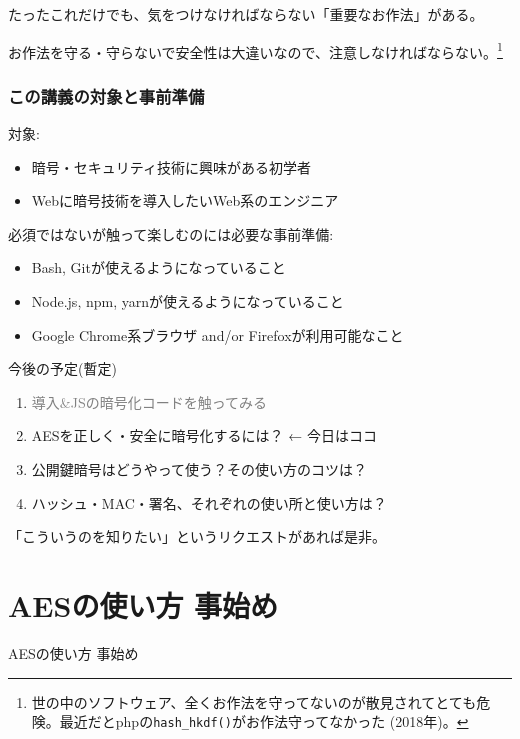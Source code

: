 \documentclass[12pt,dvipdfmx]{beamer}
\begin{document}
\begin{frame}

たったこれだけでも、気をつけなければならない\alert{「重要なお作法」}がある。

\vspace{2ex}

\alert{お作法を守る・守らないで安全性は大違い}なので、注意しなければならない。\footnote[frame]{世の中のソフトウェア、全くお作法を守ってないのが散見されてとても危険。最近だとphpの\texttt{hash\_hkdf()}がお作法守ってなかった (2018年)。}
\end{frame}

\begin{frame}
\frametitle{この講義の対象と事前準備}
対象:
\begin{itemize}
\item 暗号・セキュリティ技術に興味がある初学者
\item Webに暗号技術を導入したいWeb系のエンジニア
\end{itemize}

\vspace{2ex}

必須ではないが触って楽しむのには必要な事前準備:
\begin{itemize}
\item Bash, Gitが使えるようになっていること
\item Node.js, npm, yarnが使えるようになっていること
\item Google Chrome系ブラウザ and/or Firefoxが利用可能なこと
\end{itemize}
\end{frame}


\begin{frame}
今後の予定(暫定)
\begin{enumerate}
 \item \textcolor{gray}{導入\&JSの暗号化コードを触ってみる}
 \item \alert{AESを正しく・安全に暗号化するには？} ← 今日はココ
 \item 公開鍵暗号はどうやって使う？その使い方のコツは？
 \item ハッシュ・MAC・署名、それぞれの使い所と使い方は？
\end{enumerate}
「こういうのを知りたい」というリクエストがあれば是非。
\end{frame}



\section{AESの使い方 事始め}
\begin{frame}
\centering
{\Large AESの使い方 事始め}
\end{frame}
\end{document}
